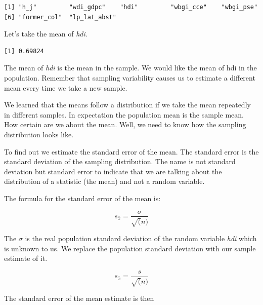 \documentclass[]{book}
\newenvironment{Shaded}{\begin{snugshade}}{\end{snugshade}}
\newcommand{\KeywordTok}[1]{\textcolor[rgb]{0.13,0.29,0.53}{\textbf{#1}}}
\newcommand{\StringTok}[1]{\textcolor[rgb]{0.31,0.60,0.02}{#1}}
\newcommand{\OperatorTok}[1]{\textcolor[rgb]{0.81,0.36,0.00}{\textbf{#1}}}
\newcommand{\NormalTok}[1]{#1}
\theoremstyle{definition}
\theoremstyle{definition}
\theoremstyle{definition}
\theoremstyle{remark}
\begin{document}
\begin{verbatim}
[1] "h_j"         "wdi_gdpc"    "hdi"         "wbgi_cce"    "wbgi_pse"   
[6] "former_col"  "lp_lat_abst"
\end{verbatim}

Let's take the mean of \emph{hdi}.

\begin{Shaded}
\end{Shaded}

\begin{verbatim}
[1] 0.69824
\end{verbatim}

The mean of \emph{hdi} is the mean in the sample. We would like the mean
of hdi in the population. Remember that sampling variability causes us
to estimate a different mean every time we take a new sample.

We learned that the means follow a distribution if we take the mean
repeatedly in different samples. In expectation the population mean is
the sample mean. How certain are we about the mean. Well, we need to
know how the sampling distribution looks like.

To find out we estimate the standard error of the mean. The standard
error is the standard deviation of the sampling distribution. The name
is not standard deviation but standard error to indicate that we are
talking about the distribution of a statistic (the mean) and not a
random variable.

The formula for the standard error of the mean is:

\[ s_{\bar{x}} = \frac{ \sigma }{ \sqrt(n) }  \]

The \(\sigma\) is the real population standard deviation of the random
variable \emph{hdi} which is unknown to us. We replace the population
standard deviation with our sample estimate of it.

\[ s_{\bar{x}} = \frac{ s }{ \sqrt(n) }  \]

The standard error of the mean estimate is then

\begin{Shaded}
\end{Shaded}
\end{document}
